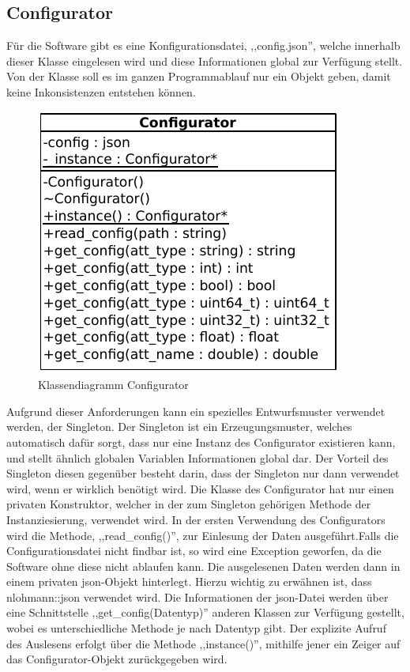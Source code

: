 \documentclass[../review_2.tex]{subfiles}
\begin{document}
\subsection{Configurator}
Für die Software gibt es eine Konfigurationsdatei, ,,config.json'', welche innerhalb dieser Klasse eingelesen wird und diese Informationen global zur Verfügung stellt. Von der Klasse soll es im ganzen Programmablauf nur ein Objekt geben, damit keine Inkonsistenzen entstehen können. 
\begin{figure}[h]
    \centering
    \includegraphics[width=0.98\linewidth]{img/configurator.pdf}
    \caption{Klassendiagramm Configurator}
    \label{Class_Configurator}
\end{figure}
Aufgrund dieser Anforderungen kann ein spezielles Entwurfsmuster verwendet werden, der Singleton. Der Singleton ist ein Erzeugungsmuster, welches automatisch dafür sorgt, dass nur eine Instanz des Configurator existieren kann, und stellt ähnlich globalen Variablen Informationen global dar. Der Vorteil des Singleton diesen gegenüber besteht darin, dass der Singleton nur dann verwendet wird, wenn er wirklich benötigt wird. Die Klasse des Configurator hat nur einen privaten Konstruktor, welcher in der zum Singleton gehörigen Methode der Instanziesierung, verwendet wird. In der ersten Verwendung des Configurators wird die Methode, ,,read\_config()'', zur Einlesung der Daten ausgeführt.Falls die Configurationsdatei nicht findbar ist, so wird eine Exception geworfen, da die Software ohne diese nicht ablaufen kann. Die ausgelesenen Daten werden dann in einem privaten json-Objekt hinterlegt. Hierzu wichtig zu erwähnen ist, dass nlohmann::json verwendet wird. Die Informationen der json-Datei werden über eine Schnittstelle ,,get\_config(Datentyp)'' anderen Klassen zur Verfügung gestellt, wobei es unterschiedliche Methode je nach Datentyp gibt. Der explizite Aufruf des Auslesens erfolgt über die Methode ,,instance()'', mithilfe jener ein Zeiger auf das Configurator-Objekt zurückgegeben wird.
\end{document}

